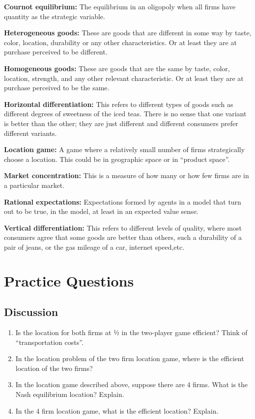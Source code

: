 \documentclass[
]{book}
\providecommand{\tightlist}{%
  \setlength{\itemsep}{0pt}\setlength{\parskip}{0pt}}
\begin{document}
\textbf{Cournot equilibrium:} The equilibrium in an oligopoly when all firms have quantity as the strategic variable.

\textbf{Heterogeneous goods:} These are goods that are different in some way by taste, color, location, durability or any other characteristics. Or at least they are at purchase perceived to be different.

\textbf{Homogeneous goods:} These are goods that are the same by taste, color, location, strength, and any other relevant characteristic. Or at least they are at purchase perceived to be the same.

\textbf{Horizontal differentiation:} This refers to different types of goods such as different degrees of sweetness of the iced teas. There is no sense that one variant is better than the other; they are just different and different consumers prefer different variants.

\textbf{Location game:} A game where a relatively small number of firms strategically choose a location. This could be in geographic space or in ``product space''.

\textbf{Market concentration:} This is a measure of how many or how few firms are in a particular market.

\textbf{Rational expectations:} Expectations formed by agents in a model that turn out to be true, in the model, at least in an expected value sense.

\textbf{Vertical differentiation:} This refers to different levels of quality, where most consumers agree that some goods are better than others, such a durability of a pair of jeans, or the gas mileage of a car, internet speed,etc.

\hypertarget{practice-questions-9}{%
\section{Practice Questions}\label{practice-questions-9}}

\hypertarget{discussion-9}{%
\subsection{Discussion}\label{discussion-9}}

\begin{enumerate}
\def\labelenumi{\arabic{enumi}.}
\tightlist
\item
  Is the location for both firms at ½ in the two-player game efficient? Think of ``transportation costs''.
\item
  In the location problem of the two firm location game, where is the efficient location of the two firms?
\item
  In the location game described above, suppose there are 4 firms. What is the Nash equilibrium location? Explain.
\item
  In the 4 firm location game, what is the efficient location? Explain.
\end{enumerate}
\end{document}
